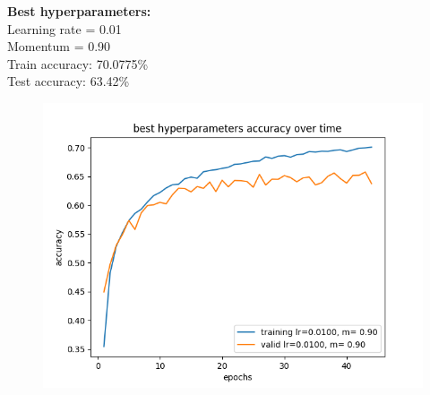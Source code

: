 \documentclass{article}
\newcommand{\1}{\mathbf{1}}
\begin{document}
{\begin{figure}[h]
  \centering
\end{figure}

\newpage

\textbf{Best hyperparameters:} \\ 
Learning rate = 0.01 \\ 
Momentum = 0.90 \\
Train accuracy: 70.0775\% \\
Test accuracy: 63.42\%

\begin{figure}[h]
  \centering
  \includegraphics[width=130mm]{../hw3-code/results/a6c/a6_c_best.png}
\end{figure}

}
\end{document}
